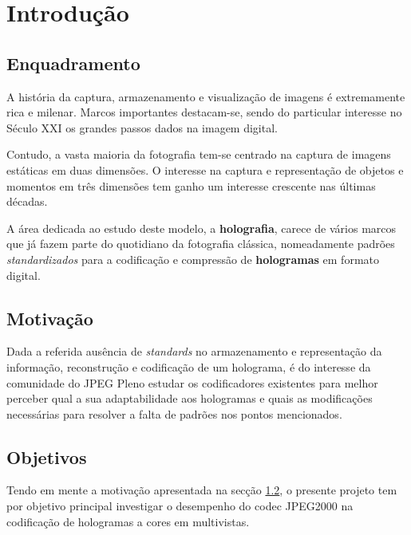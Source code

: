 \chapter{Introdução}
\label{chap:intro}

\section{Enquadramento}
\label{sec:amb}

A história da captura, armazenamento e visualização de imagens é extremamente rica e milenar. Marcos importantes destacam-se, sendo do particular interesse no Século XXI os grandes passos dados na imagem digital.

Contudo, a vasta maioria da fotografia tem-se centrado na captura de imagens estáticas em duas dimensões. O interesse na captura e representação de objetos e momentos em três dimensões tem ganho um interesse crescente nas últimas décadas.

A área dedicada ao estudo deste modelo, a \textbf{holografia}, carece de vários marcos que já fazem parte do quotidiano da fotografia clássica, nomeadamente padrões \textit{standardizados} para a codificação e compressão de \textbf{hologramas} em formato digital.


\section{Motivação}
\label{sec:mot}
Dada a referida ausência de \textit{standards} no armazenamento e representação da informação, reconstrução e codificação de um holograma, é do interesse da comunidade do JPEG Pleno estudar os codificadores existentes para melhor perceber qual a sua adaptabilidade aos hologramas e quais as modificações necessárias para resolver a falta de padrões nos pontos mencionados.


\section{Objetivos}
\label{sec:obj}

Tendo em mente a motivação apresentada na secção \ref{sec:mot}, o presente projeto tem por objetivo principal investigar o desempenho do codec JPEG2000 na codificação de hologramas a cores em multivistas.

